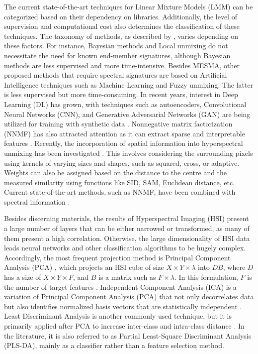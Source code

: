 The current state-of-the-art techniques for Linear Mixture Models (LMM) can be categorized based on their dependency on libraries. Additionally, the level of supervision and computational cost also determines the classification of these techniques. The taxonomy of methods, as described by \cite{borsoi_spectral_2021}, varies depending on these factors. For instance, Bayesian methods and Local unmixing do not necessitate the need for known end-member signatures, although Bayesian methods are less supervised and more time-intensive. Besides MESMA, other proposed methods that require spectral signatures are based on Artificial Intelligence techniques such as Machine Learning and Fuzzy unmixing. The latter is less supervised but more time-consuming. In recent years, interest in Deep Learning (DL) has grown, with techniques such as autoencoders, Convolutional Neural Networks (CNN), and Generative Adversarial Networks (GAN) are being utilized for training with synthetic data \cite{bhatt_deep_2020}. Nonnegative matrix factorization (NNMF) has also attracted attention as it can extract sparse and interpretable features \cite{hruska_machine_2018}. Recently, the incorporation of spatial information into hyperspectral unmixing has been investigated \cite{shi_incorporating_2014}. This involves considering the surrounding pixels using kernels of varying sizes and shapes, such as squared, cross, or adaptive. Weights can also be assigned based on the distance to the centre and the measured similarity using functions like SID, SAM, Euclidean distance, etc. Current state-of-the-art methods, such as NNMF, have been combined with spectral information \cite{zhang_spectral-spatial_2022}.

Besides discerning materials, the results of Hyperspectral Imaging (HSI) present a large number of layers that can be either narrowed or transformed, as many of them present a high correlation. Otherwise, the large dimensionality of HSI data leads neural networks and other classification algorithms to be hugely complex. Accordingly, the most frequent projection method is Principal Component Analysis (PCA) \cite{jiang_rapid_2022, shenming_new_2022, lu_hyperspectral_2022}, which projects an HSI cube of size $X \times Y \times \lambda$ into $DB$, where $D$ has a size of $X \times Y \times F$, and $B$ is a matrix such as $F \times \lambda$. In this formulation, $F$ is the number of target features \cite{amigo_hyperspectral_2019}. Independent Component Analysis (ICA) is a variation of Principal Component Analysis (PCA) that not only decorrelates data but also identifies normalized basis vectors that are statistically independent \cite{pu_hyperspectral_2017}. Least Discriminant Analysis is another commonly used technique, but it is primarily applied after PCA to increase inter-class and intra-class distance \cite{shenming_new_2022}. In the literature, it is also referred to as Partial Least-Square Discriminant Analysis (PLS-DA), mainly as a classifier rather than a feature selection method.

